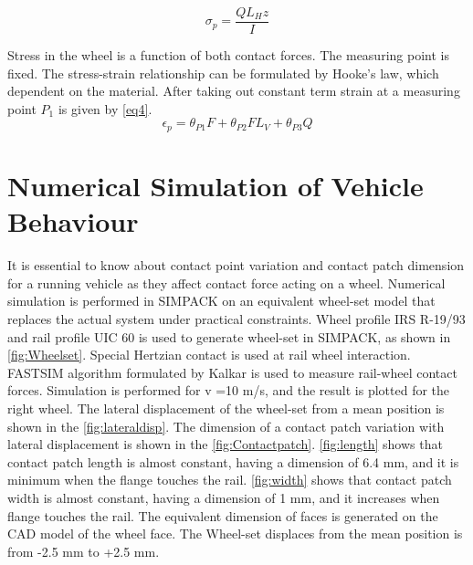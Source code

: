 \documentclass[]{interact}
\theoremstyle{plain}%
\theoremstyle{definition}
\theoremstyle{remark}
\begin{document}
\begin{equation}
\sigma_p= \frac{QL_Hz}{I}    \label{eq3}
\end{equation}

Stress in the wheel is a function of both contact forces. The measuring point is fixed. The stress-strain relationship can be formulated by Hooke’s law, which dependent on the material. After taking out constant term strain at a measuring point $P_1$ is given by \cref{eq4}.
\begin{equation}
\epsilon_p=  \theta_{P1}F+ \theta_{P2}FL_V+ \theta_{P3}Q     \label{eq4}
\end{equation}

\section{Numerical Simulation of Vehicle Behaviour}
It is essential to know about contact point variation and contact patch dimension for a running vehicle as they affect contact force acting on a wheel. Numerical simulation is performed in SIMPACK on an equivalent wheel-set model that replaces the actual system under practical constraints. Wheel profile IRS R-19/93 and rail profile UIC 60 is used to generate wheel-set in SIMPACK, as shown in \cref{fig:Wheelset}. Special Hertzian contact is used at rail wheel interaction. FASTSIM algorithm formulated by Kalkar is used to measure rail-wheel contact forces. Simulation is performed for v =10 m/s, and the result is plotted for the right wheel.  The lateral displacement of the wheel-set from a mean position is shown in the \cref{fig:lateraldisp}. The dimension of a contact patch variation with lateral displacement is shown in the \cref{fig:Contactpatch}. \cref{fig:length} shows that contact patch length is almost constant, having a dimension of 6.4 mm, and it is minimum when the flange touches the rail. \cref{fig:width} shows that contact patch width is almost constant, having a dimension of 1 mm, and it increases when flange touches the rail. The equivalent dimension of faces is generated on the CAD model of the wheel face. The Wheel-set displaces from the mean position is from  -2.5 mm to +2.5 mm.
\end{document}
